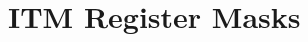 \hypertarget{group___i_t_m___register___masks}{}\section{I\+TM Register Masks}
\label{group___i_t_m___register___masks}
